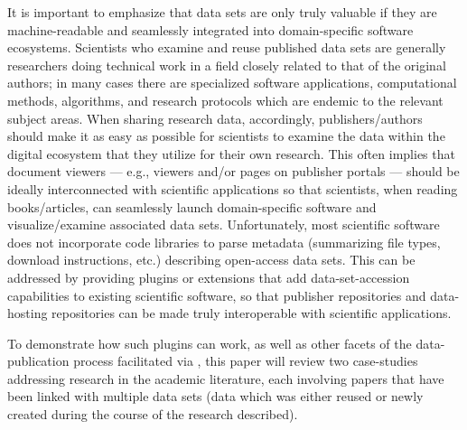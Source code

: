 \documentclass[11pt,letterpaper]{article}
\newcommand{\ATexttclr}[1]{\textcolor{tcolor}{\textbf{#1}}}
\newcommand{\textscc}[1]{{\color{orr!35!black}{{%
						\fontfamily{Cabin-TLF}\fontseries{b}\selectfont{\textsc{\scriptsize{#1}}}}}}}
\newcommand{\AcronymText}[1]{{\textscc{#1}}}
\newcommand{\SDRF}{\resizebox{!}{8pt}{\ATexttclr{S}}\resizebox{!}{8pt}{\ATexttclr{DR%
\hspace{1pt}{\raisebox{-1pt}{\fontfamily{qhv}\fontseries{b}\selectfont{}\Large{F}}%
}}}}
\newcommand{\HTML}{\resizebox{!}{7pt}{\AcronymText{HTML}}}
\newcommand{\PDF}{\resizebox{!}{7pt}{\AcronymText{PDF}}}
\newcommand{\p}[1]{

\vspace{.7em}#1}
\begin{document}
{\p{It is important to emphasize that data sets are only truly valuable if they are machine-readable and seamlessly integrated into domain-specific software ecosystems.  Scientists who examine and reuse published data sets are generally researchers doing technical work in a field closely related to that of the original authors; in many cases there are specialized software applications, computational methods, algorithms, and research protocols which are endemic to the relevant subject areas.  When sharing research data, accordingly, publishers/authors should make it as easy as possible for scientists to examine the data within the digital ecosystem that they utilize for their own research.  This often implies that document viewers --- e.g., \PDF{} viewers and/or \HTML{} pages on publisher portals --- should be ideally interconnected with scientific applications so that scientists, when reading books/articles, can seamlessly launch domain-specific software and visualize/examine associated data sets.  Unfortunately, most scientific software does not incorporate code libraries to parse metadata (summarizing file types, download instructions, etc.) describing open-access data sets.  This can be addressed by providing plugins or extensions that add data-set-accession capabilities to existing scientific software, so that publisher repositories and data-hosting repositories can be made truly interoperable with scientific applications.}

\p{To demonstrate how such plugins can work, as well as other facets of the data-publication process facilitated via \SDRF{}, this paper will review two case-studies addressing 
research in the academic literature, each involving papers that have been 
linked with multiple data sets (data which was either reused or newly created 
during the course of the research described).
}

\begin{figure}
\end{figure}}
\end{document}
